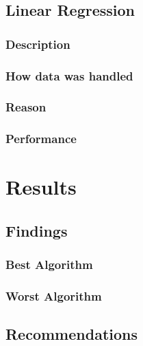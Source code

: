 \documentclass[12pt]{article}
\begin{document}
	\subsection{Linear Regression}
	\subsubsection{Description}
	\subsubsection{How data was handled}
	\subsubsection{Reason}
	\subsubsection{Performance}
	\newpage
	\section{Results}
	\subsection{Findings}
	\subsubsection{Best Algorithm}
	\subsubsection{Worst Algorithm}
	\subsection{Recommendations}
	
\end{document}
